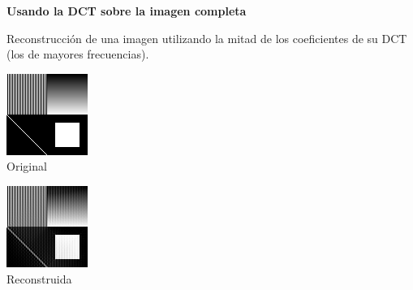\documentclass{beamer}
\begin{document}
\begin{frame}


    \textbf{Usando la DCT sobre la imagen completa}

    Reconstrucción de una imagen utilizando la mitad de los coeficientes de su DCT (los de mayores frecuencias).

    \begin{minipage}[t]{0.4\linewidth}
        \begin{center}
            \includegraphics[scale=1.25]{fig/no_homogenea.png}\\         Original
        \end{center}
    \end{minipage}
    \hfill
    \begin{minipage}[t]{0.4\linewidth}
        \begin{center}
            \includegraphics[scale=1.25]{fig/no_homogenea_comprimida.png}\\
            Reconstruida
        \end{center}
    \end{minipage}

\end{frame}
\end{document}
